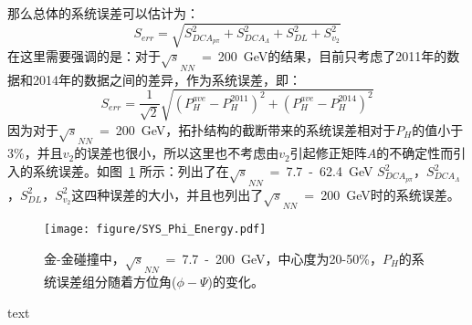那么总体的系统误差可以估计为：
\begin{equation}
S_{err} = \sqrt{ S_{DCA_{p\pi}}^{2} + S_{DCA_{\Lambda}}^{2} + S_{DL}^{2} + S_{v_{2}}^{2} }
\end{equation}
在这里需要强调的是：对于$\sqrt{s}_{NN}$~=~200~GeV的结果，目前只考虑了2011年的数据和2014年的数据之间的差异，作为系统误差，即：
\begin{equation}
S_{err} = \frac{1}{\sqrt{2}} \sqrt{ (P_{H}^{ave}-P_{H}^{2011})^2 + (P_{H}^{ave}-P_{H}^{2014})^2 }
\end{equation}
因为对于$\sqrt{s}_{NN}$~=~200~GeV，拓扑结构的截断带来的系统误差相对于$P_{H}$的值小于3\%，并且$v_{2}$的误差也很小，所以这里也不考虑由$v_{2}$引起修正矩阵$A$的不确定性而引入的系统误差。如图~\ref{fig:sys_phi_energy} 所示：列出了在$\sqrt{s}_{NN}$~=~7.7~-~62.4~GeV $S_{DCA_{p\pi}}^{2}$，$S_{DCA_{\Lambda}}^{2}$，$S_{DL}^{2}$，$S_{v_{2}}^{2}$这四种误差的大小，并且也列出了$\sqrt{s}_{NN}$~=~200~GeV时的系统误差。
\begin{figure}[htbp]
\centering
\texttt{[image: figure/SYS\_Phi\_Energy.pdf]}
\caption{金-金碰撞中，$\sqrt{s}_{NN}$~=~7.7~-~200~GeV，中心度为20-50\%，$P_{H}$的系统误差组分随着方位角($\phi-\Psi$)的变化。}
\label{fig:sys_phi_energy}
\end{figure}


text


